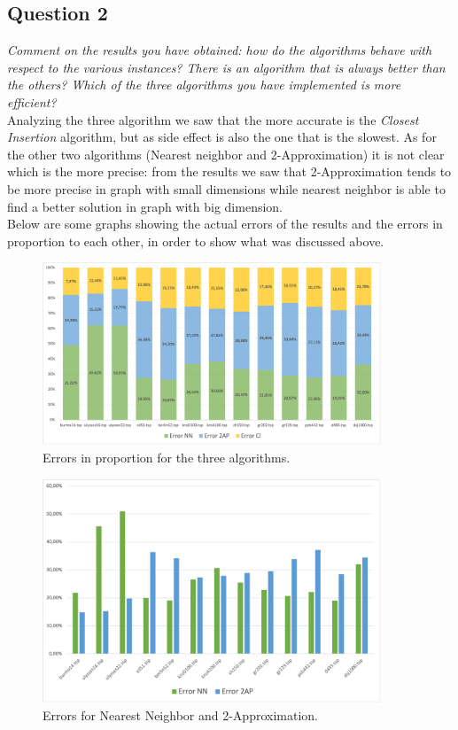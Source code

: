 \subsection{Question 2}
\textit{Comment on the results you have obtained: how do the algorithms behave with respect to the various 
instances? There is an algorithm that is always better than the others? Which of the three algorithms you 
have implemented is more efficient?} \\

\noindent
Analyzing the three algorithm we saw that the more accurate is the \textit{Closest Insertion} algorithm, but as side effect is also the one that is the slowest.
As for the other two algorithms (Nearest neighbor and 2-Approximation) it is not clear which is the more precise: from the results we saw that 2-Approximation tends to be more precise in graph with small dimensions while nearest neighbor is able to find a better solution in graph with big dimension.\\
Below are some graphs showing the actual errors of the results and the errors in proportion to each other, in order to show what was discussed above.

\begin{figure}[H]
    \centering
    \includegraphics[width=0.9\textwidth]{./img/errore_in_proporzione_ord.png}
    \caption{Errors in proportion for the three algorithms.}
    \label{fig:proportion_error_ord}
\end{figure}

\begin{figure}[H]
    \centering
    \includegraphics[width=0.9\textwidth]{./img/error_nn_2ap.png}
    \caption{Errors for Nearest Neighbor and 2-Approximation.}
    \label{fig:error_nn_2ap}
\end{figure}

